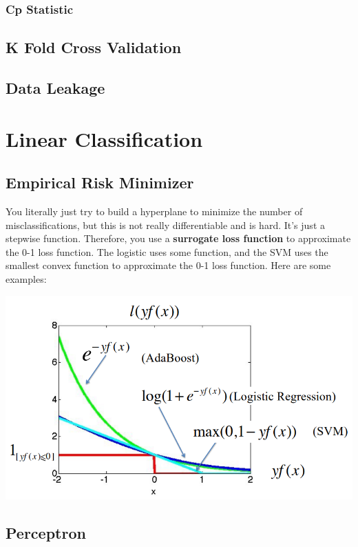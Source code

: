 \documentclass{article}
\begin{document}
    \subsubsection{Cp Statistic}

  \subsection{K Fold Cross Validation}

  \subsection{Data Leakage}

\section{Linear Classification}

  \subsection{Empirical Risk Minimizer} 

    You literally just try to build a hyperplane to minimize the number of misclassifications, but this is not really differentiable and is hard. It's just a stepwise function. Therefore, you use a \textbf{surrogate loss function} to approximate the 0-1 loss function. The logistic uses some function, and the SVM uses the smallest convex function to approximate the 0-1 loss function. Here are some examples: 
    \begin{center}
      \includegraphics[scale=0.35]{img/loss_functions_class.png}
    \end{center}

  \subsection{Perceptron}
\end{document}
